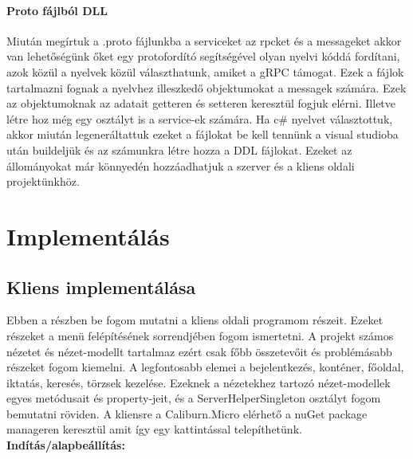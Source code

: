 \documentclass[
]{thesis-ekf}
\theoremstyle{definition}
\theoremstyle{remark}
\begin{document}
\subsubsection{Proto fájlból DLL}
Miután megírtuk a .proto fájlunkba a serviceket az rpcket és a messageket akkor van lehetőségünk őket egy protofordító segítségével olyan nyelvi kóddá fordítani, azok közül a nyelvek közül választhatunk, amiket a gRPC támogat. Ezek a fájlok tartalmazni fognak a nyelvhez illeszkedő objektumokat a messagek számára. Ezek az objektumoknak az adatait getteren és setteren keresztül fogjuk elérni. Illetve létre hoz még egy osztályt is a service-ek számára. Ha c\# nyelvet választottuk, akkor miután legeneráltattuk ezeket a fájlokat be kell tennünk a visual studioba után buildeljük és az számunkra létre hozza a DDL fájlokat. Ezeket az állományokat már könnyedén hozzáadhatjuk a szerver és a kliens oldali projektünkhöz.
\chapter{Implementálás}
\section {Kliens implementálása}
Ebben a részben be fogom mutatni a kliens oldali programom részeit. Ezeket  részeket a menü felépítésének sorrendjében fogom ismertetni. A projekt számos nézetet és nézet-modellt tartalmaz ezért csak főbb összetevőit és problémásabb részeket fogom kiemelni. A legfontosabb elemei a bejelentkezés, konténer, főoldal, iktatás, keresés, törzsek kezelése. Ezeknek a nézetekhez tartozó nézet-modellek egyes metódusait és property-jeit, és a ServerHelperSingleton osztályt fogom bemutatni röviden. A kliensre a Caliburn.Micro elérhető a nuGet package manageren keresztül amit így egy kattintással telepíthetünk. \\
\textbf{Indítás/alapbeállítás:}
\end{document}
